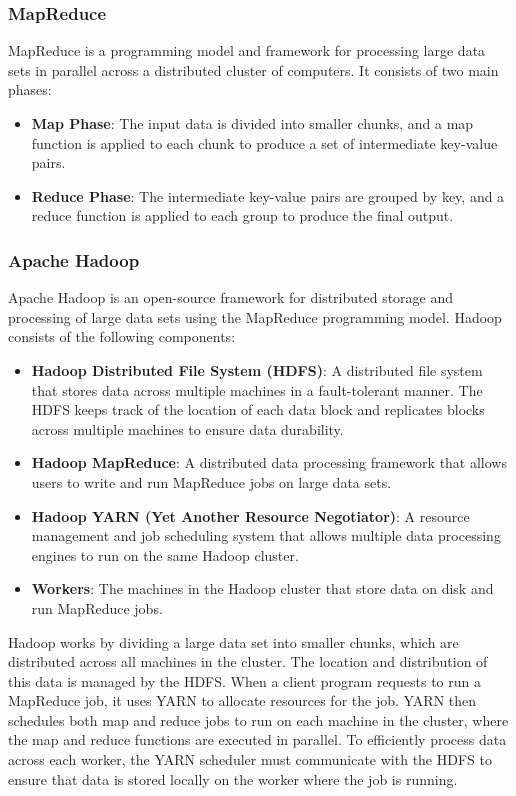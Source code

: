 \documentclass{article}
\begin{document}
\subsubsection{MapReduce}
MapReduce is a programming model and framework for processing large
data sets in parallel across a distributed cluster of computers. It
consists of two main phases:
\begin{itemize}
    \item \textbf{Map Phase}: The input data is divided into smaller
          chunks, and a map function is applied to each chunk to produce
          a set of intermediate key-value pairs.
    \item \textbf{Reduce Phase}: The intermediate key-value pairs are
          grouped by key, and a reduce function is applied to each group
          to produce the final output.
\end{itemize}
\subsubsection{Apache Hadoop}
Apache Hadoop is an open-source framework for distributed storage and
processing of large data sets using the MapReduce programming model.
Hadoop consists of the following components:
\begin{itemize}
    \item \textbf{Hadoop Distributed File System (HDFS)}: A distributed
          file system that stores data across multiple machines in a
          fault-tolerant manner. The HDFS keeps track of the location of
          each data block and replicates blocks across multiple
          machines to ensure data durability.
    \item \textbf{Hadoop MapReduce}: A distributed data processing
          framework that allows users to write and run MapReduce jobs
          on large data sets.
    \item \textbf{Hadoop YARN (Yet Another Resource Negotiator)}: A
          resource management and job scheduling system that allows
          multiple data processing engines to run on the same Hadoop
          cluster.
    \item \textbf{Workers}: The machines in the Hadoop cluster that
          store data on disk and run MapReduce jobs.
\end{itemize}
Hadoop works by dividing a large data set into smaller chunks, which
are distributed across all machines in the cluster. The location and
distribution of this data is managed by the HDFS. When a client program
requests to run a MapReduce job, it uses YARN to allocate resources for
the job. YARN then schedules both map and reduce jobs to run on each
machine in the cluster, where the map and reduce functions are executed
in parallel.
To efficiently process data across each worker, the YARN scheduler must
communicate with the HDFS to ensure that data is stored locally on the
worker where the job is running.
\end{document}
